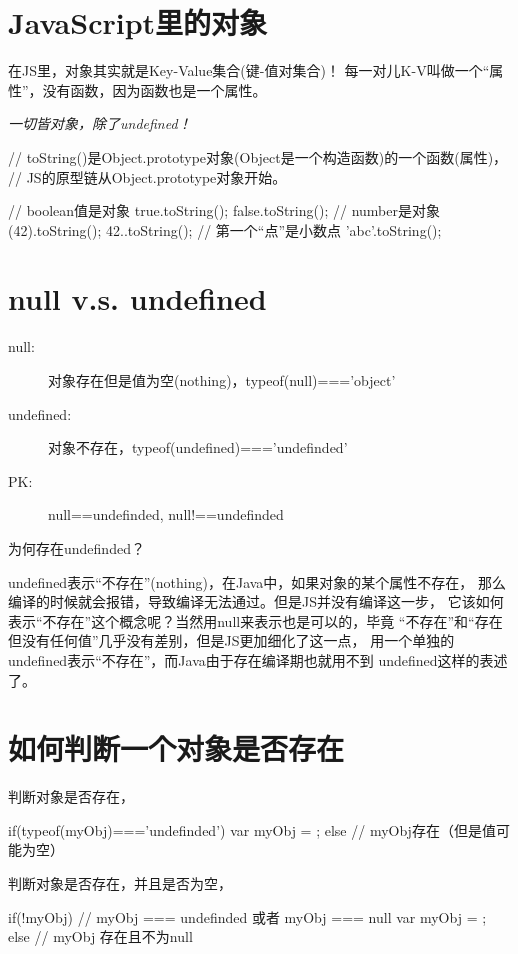 ﻿\section[JavaScript里的对象]{JavaScript里的对象}
在JS里，对象其实就是Key-Value集合(键-值对集合)！
每一对儿K-V叫做一个“属性”，没有函数，因为函数也是一个属性。

\emph{一切皆对象，除了undefined！}

\begin{javascriptcode}
// toString()是Object.prototype对象(Object是一个构造函数)的一个函数(属性)，
// JS的原型链从Object.prototype对象开始。

// boolean值是对象
true.toString();
false.toString();
// number是对象
(42).toString();
42..toString(); // 第一个“点”是小数点
'abc'.toString();
\end{javascriptcode}

\section[null v.s. undefined]{null v.s. undefined}
\begin{description}
  \item[null: ] 对象存在但是值为空(nothing)，typeof(null)==='object'
  \item[undefined: ] 对象不存在，typeof(undefined)==='undefinded'
  \item[PK: ] null==undefinded, null!==undefinded
\end{description}

为何存在undefinded？

undefined表示“不存在”(nothing)，在Java中，如果对象的某个属性不存在，
那么编译的时候就会报错，导致编译无法通过。但是JS并没有编译这一步，
它该如何表示“不存在”这个概念呢？当然用null来表示也是可以的，毕竟
“不存在”和“存在但没有任何值”几乎没有差别，但是JS更加细化了这一点，
用一个单独的undefined表示“不存在”，而Java由于存在编译期也就用不到
undefined这样的表述了。


\section[如何判断一个对象是否存在]{如何判断一个对象是否存在}
判断对象是否存在，

\begin{javascriptcode}
if(typeof(myObj)==='undefinded') {
  var myObj = { };
} else {
  // myObj存在（但是值可能为空）
}
\end{javascriptcode}

判断对象是否存在，并且是否为空，

\begin{javascriptcode}
if(!myObj) {
  // myObj === undefinded 或者 myObj === null
  var myObj = { };
} else {
  // myObj 存在且不为null
}
\end{javascriptcode}